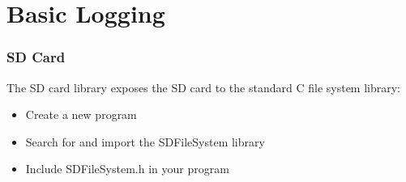 \section{Basic Logging}
\label{sec:basic_logging}

\begin{frame}
	\frametitle{SD Card}
	The SD card library exposes the SD card to the standard C file system library:
	\begin{itemize}
		\item Create a new program
		\item Search for and import the SDFileSystem library
		\item Include SDFileSystem.h in your program
	\end{itemize}
\end{frame}